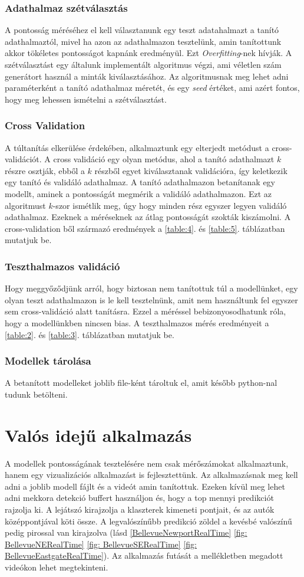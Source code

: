 \documentclass[acmtog, authorversion]{acmart}
\begin{document}
\subsubsection{Adathalmaz szétválasztás}
A pontosság méréséhez el kell választanunk egy teszt adatahalmazt a tanító adathalmaztól, mivel ha azon az adathalmazon tesztelünk, amin tanítottunk
akkor tökéletes pontosságot kapnánk eredményül. Ezt \emph{Overfitting}-nek hívják. A szétválasztást egy általunk implementált algoritmus végzi, ami véletlen szám generátort használ a
minták kiválasztásához. Az algoritmusnak meg lehet adni paraméterként a tanító adathalmaz méretét, és egy \emph{seed} értéket, ami azért fontos, hogy meg
lehessen ismételni a szétválasztást.
\subsubsection{Cross Validation}
A túltanítás elkerülése érdekében, alkalmaztunk egy elterjedt metódust a cross-validációt. A cross validáció egy olyan metódus, ahol a tanító adathalmazt
$k$ részre osztják, ebből a $k$ részből egyet kiválasztanak validációra, így keletkezik egy tanító és validáló adathalmaz. A tanító adathalmazon betanítanak
egy modellt, aminek a pontosságát megmérik a validáló adathalmazon. Ezt az algoritmust $k$-szor ismétlik meg, úgy hogy minden rész egyszer legyen validáló
adathalmaz. Ezeknek a méréseknek az átlag pontosságát szokták kiszámolni. A cross-validation ből származó eredmények a \ref{table:4}. és \ref{table:5}. 
táblázatban mutatjuk be.
\subsubsection{Teszthalmazos validáció}
Hogy meggyőződjünk arról, hogy biztosan nem tanítottuk túl a modellünket, egy olyan teszt adathalmazon is le kell tesztelnünk, amit nem használtunk fel egyszer sem
cross-validáció alatt tanításra. Ezzel a méréssel bebizonyosodhatunk róla, hogy a modellünkben nincsen bias. A teszthalmazos mérés eredményeit a \ref{table:2}. és \ref{table:3}.
táblázatban mutatjuk be.
\subsubsection{Modellek tárolása}
A betanított modelleket joblib file-ként tároltuk el, amit később python-nal tudunk betölteni.

\section{Valós idejű alkalmazás}
A modellek pontosságának tesztelésére nem csak mérőszámokat alkalmaztunk, hanem egy vizualizációs alkalmazást is fejlesztettünk. Az alkalmazásnak meg kell adni
a joblib modell fájlt és a videót amin tanítottuk. Ezeken kívül meg lehet adni mekkora detekció buffert használjon és, hogy a top mennyi predikciót rajzolja ki.
A lejátszó kirajzolja a klaszterek kimeneti pontjait, és az autók középpontjával köti össze. A legvalószínűbb predikció zöldel a kevésbé valószínű pedig pirossal
van kirajzolva (lásd \ref{BellevueNewportRealTime} \ref{fig: BellevueNERealTime} \ref{fig: BellevueSERealTime} \ref{fig: BellevueEastgateRealTime}). 
Az alkalmazás futását a mellékletben megadott videókon lehet megtekinteni.
\end{document}
